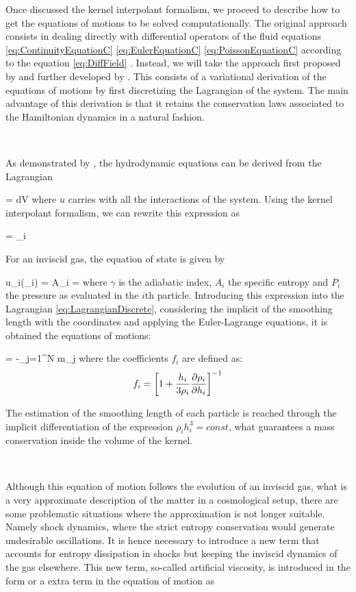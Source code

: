 \documentclass[a4,useAMS,usenatbib,usegraphicx,12pt]{article}
\begin{document}
Once discussed the kernel interpolant formalism, we proceed to describe how to
get the equations of motions to be solved computationally. The original approach
consists in dealing directly with differential operators of the fluid equations 
\ref{eq:ContinuityEquationC} \ref{eq:EulerEquationC} \ref{eq:PoissonEquationC}
according to the equation \ref{eq:DiffField} \citep{Lucy77,Gingold77}. Instead,
we will take the approach first proposed by \citet{Gingold82} and further 
developed by \citet{Springel11}. This consists of a variational derivation of
the equations of motions by first discretizing the Lagrangian of the system. 
The main advantage of this derivation is that it retains the conservation laws
associated to the Hamiltonian dynamics in a natural fashion.

\

As demonstrated by \citet{Eckart60}, the hydrodynamic equations can be derived
from the Lagrangian

{  = \int \rho {}dV }
where $u$ carries with all the interactions of the system. Using the kernel 
interpolant formalism, we can rewrite this expression as

{  = \sum_i  }

For an inviscid gas, the equation of state is given by

{ u_i(\rho_i) = A_i = 
 }
where $\gamma$ is the adiabatic index, $A_i$ the specific entropy and $P_i$ the
pressure as evaluated in the $i$th particle. Introducing this expression into
the Lagrangian \ref{eq:LagrangianDiscrete}, considering the implicit of the
smoothing length with the coordinates and applying the Euler-Lagrange equations,
it is obtained the equations of motions:

{ = -\sum_{j=1}^N m_j  }
where the coefficients $f_i$ are defined as:
\[ f_i = \left[  1+\frac{h_i}{3\rho_i}\frac{\partial \rho_i}{\partial h_i}  \right]^{-1} \]

The estimation of the smoothing length of each particle is reached through the
implicit differentiation of the expression $\rho_i h_i^3 = const$, what 
guarantees a mass conservation inside the volume of the kernel.

\

Although this equation of motion follows the evolution of an inviscid gas, what
is a very approximate description of the matter in a cosmological setup, there
are some problematic situations where the approximation is not longer suitable.
Namely shock dynamics, where the strict entropy conservation would generate
undesirable oscillations. It is hence necessary to introduce a new term that 
accounts for entropy dissipation in shocks but keeping the inviscid dynamics of
the gas elsewhere. This new term, so-called artificial viscosity, is introduced 
in the form or a extra term in the equation of motion as
\end{document}
